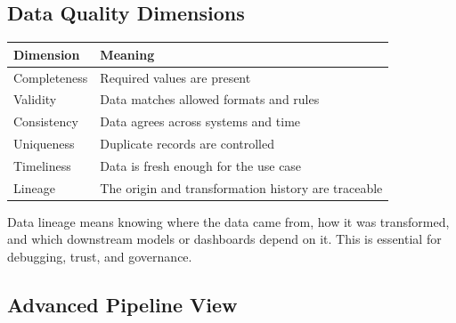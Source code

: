 \documentclass[11pt,a4paper]{article}
\begin{document}
\subsection{Data Quality Dimensions}

\begin{longtable}{@{}p{3.0cm}p{10cm}@{}}
\toprule
\rowcolor{primary!15}
\textbf{Dimension} & \textbf{Meaning} \\
\midrule
\endhead
Completeness & Required values are present \\
\addlinespace
Validity & Data matches allowed formats and rules \\
\addlinespace
Consistency & Data agrees across systems and time \\
\addlinespace
Uniqueness & Duplicate records are controlled \\
\addlinespace
Timeliness & Data is fresh enough for the use case \\
\addlinespace
Lineage & The origin and transformation history are traceable \\
\bottomrule
\end{longtable}

\begin{conceptbox}
Data lineage means knowing where the data came from, how it was transformed, and which downstream models or dashboards depend on it. This is essential for debugging, trust, and governance.
\end{conceptbox}

\subsection{Advanced Pipeline View}

\begin{center}
\end{center}
\end{document}
